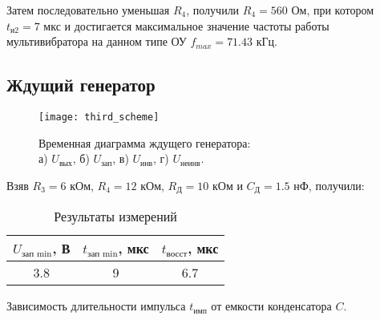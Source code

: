 Затем последовательно уменьшая $R_4$, получили $R_4 = 560$ Ом, при котором $t_{\text{и2}} = 7$ мкс и достигается максимальное значение частоты работы мультивибратора на данном типе ОУ $f_{max} = 71.43$ кГц.

\newpage

\subsection{Ждущий генератор}

\begin{figure}[H]
\begin{center}
	\texttt{[image: third\_scheme]}
	\captionsetup{margin=0cm}
	\caption{Временная диаграмма ждущего генератора:\\ а) $U_\text{вых}$, б) $U_\text{зап}$, в) $U_\text{инв}$, г) $U_\text{неинв}$.} 
	\label{fig:diff}
\end{center}
\end{figure}

Взяв $R_3 = 6$ кОм, $R_4 = 12$ кОм, $R_\text{Д} = 10$ кОм и $C_\text{Д} = 1.5$ нФ, получили:

\begin{table}[H]
\begin{center}
	\caption{Результаты измерений}
	\def\tabcolsep{10pt}
	\begin{tabular}{|c|c|c|}
		\hline
		$U_\text{зап\ min}$, В &
		$t_\text{зап\ min}$, мкс &
		$t_{\text{восст}}$, мкс \\
		\hline
		3.8 &
		9 &
		6.7 \\
	    \hline	
	\end{tabular}
\end{center}
\end{table}

\begin{table}[H]
\begin{center}
	\caption{Зависимость длительности импульса $t_\text{имп}$ от емкости конденсатора $C$.}
	\label{tab:limiter}
	\def\tabcolsep{20pt}
	\def\arraystretch{1.23}
	\fontsize{13}{14}\selectfont
\end{center}
\end{table}

